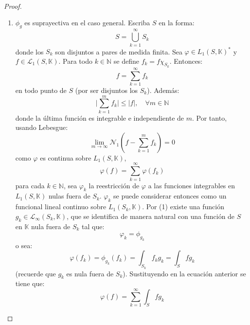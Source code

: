 \documentclass[12pt]{report}
\newcounter{it}
\theoremstyle{largebreak}
\newcommand\abs[1]{\ensuremath{\big|#1\big|}}
\newcommand{\N}[2]{\ensuremath{\mathcal{N}_{#1}\left(#2\right)}}
\begin{document}
\begin{proof}
\begin{enumerate}
            \item $\phi_g$ es suprayectiva en el caso general. Escriba $S$ en la forma:
            \begin{equation*}
                S=\bigcup_{ k=1}^\infty S_k
            \end{equation*}
            donde los $S_k$ son disjuntos a pares de medida finita. Sea $\varphi\in L_1(S,\mathbb{K})^*$ y $f\in\mathcal{L}_1(S,\mathbb{K})$. Para todo $k\in\mathbb{N}$ se define $f_k=f\chi_{S_k}$. Entonces:
            \begin{equation*}
                f=\sum_{ k=1}^{\infty}f_k
            \end{equation*}
            en todo punto de $S$ (por ser disjuntos los $S_k$). Además:
            \begin{equation*}
                \abs{\sum_{ k=1}^{m}f_k}\leq \abs{f},\quad\forall m\in\mathbb{N}
            \end{equation*}
            donde la última función es integrable e independiente de $m$.
            Por tanto, usando Lebesgue:
            \begin{equation*}
                \lim_{ m\rightarrow\infty}\N{1}{f-\sum_{ k=1}^{m}f_k}=0
            \end{equation*}
            como $\varphi$ es continua sobre $L_1(S,\mathbb{K})$,
            \begin{equation}
                \varphi(f)=\sum_{ k=1}^{\infty}\varphi(f_k)
            \end{equation}
            para cada $k\in\mathbb{N}$, sea $\varphi_k$ la reestricción de $\varphi$ a las funciones integrables en $L_1(S,\mathbb{K})$ nulas fuera de $S_k$. $\varphi_k$ se puede considerar entonces como un funcional lineal continuo sobre $L_1(S_k,\mathbb{K})$. Por (1) existe una función $g_k\in\mathcal{L}_\infty(S_k,\mathbb{K})$, que se identifica de manera natural con una función de $S$ en $\mathbb{K}$ nula fuera de $S_k$ tal que:
            \begin{equation*}
                \varphi_k=\phi_{g_k}
            \end{equation*}
            o sea:
            \begin{equation*}
                \varphi(f_k)=\phi_{ g_k}(f_k)=\int_{S_k}f_kg_k=\int_Sfg_k
            \end{equation*}
            (recuerde que $g_k$ es nula fuera de $S_k$). Sustituyendo en la ecuación anterior se tiene que:
            \begin{equation*}
                \varphi(f)=\sum_{ k=1}^{\infty}\int_Sfg_k

\end{equation*}
\end{enumerate}
\end{proof}
\end{document}
